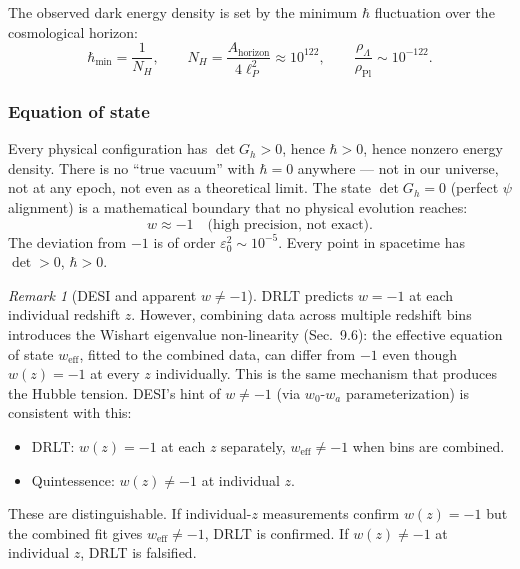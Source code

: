 \documentclass[12pt]{article}
\theoremstyle{remark}
\newtheorem{remark}[theorem]{Remark}
\theoremstyle{definition}
\begin{document}
The observed dark energy density is set by the minimum $\hbar$ fluctuation over the cosmological horizon:
\begin{equation}
\hbar_\text{min} = \frac{1}{N_H}, \qquad N_H = \frac{A_\text{horizon}}{4\ell_P^2} \approx 10^{122}, \qquad \frac{\rho_\Lambda}{\rho_\text{Pl}} \sim 10^{-122}.
\end{equation}

\subsubsection{Equation of state}

Every physical configuration has $\det G_h > 0$, hence $\hbar > 0$, hence nonzero energy density. There is no ``true vacuum'' with $\hbar = 0$ anywhere --- not in our universe, not at any epoch, not even as a theoretical limit. The state $\det G_h = 0$ (perfect $\psi$ alignment) is a mathematical boundary that no physical evolution reaches:
\begin{equation}
\boxed{w \approx -1 \quad\text{(high precision, not exact)}.}
\end{equation}
The deviation from $-1$ is of order $\varepsilon_0^2 \sim 10^{-5}$. Every point in spacetime has $\det > 0$, $\hbar > 0$.

\begin{remark}[DESI and apparent $w \neq -1$]
DRLT predicts $w = -1$ at each individual redshift $z$. However, combining data across multiple redshift bins introduces the Wishart eigenvalue non-linearity (Sec.~9.6): the effective equation of state $w_\text{eff}$, fitted to the combined data, can differ from $-1$ even though $w(z) = -1$ at every $z$ individually. This is the same mechanism that produces the Hubble tension. DESI's hint of $w \neq -1$ (via $w_0$-$w_a$ parameterization) is consistent with this:

\begin{itemize}
\item DRLT: $w(z) = -1$ at each $z$ separately, $w_\text{eff} \neq -1$ when bins are combined.
\item Quintessence: $w(z) \neq -1$ at individual $z$.
\end{itemize}

These are distinguishable. If individual-$z$ measurements confirm $w(z) = -1$ but the combined fit gives $w_\text{eff} \neq -1$, DRLT is confirmed. If $w(z) \neq -1$ at individual $z$, DRLT is falsified.
\end{remark}
\end{document}
